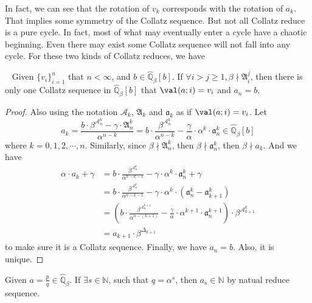 In fact, we can see that the rotation of $v_{k}$ corresponds with the rotation of $a_k$.
That implies some symmetry of the Collatz sequence.
But not all Collatz reduce is a pure cycle.
In fact, most of  what may eventually enter a cycle have a chaotic beginning.
Even there may exist some Collatz sequence will not fall into any cycle.
For these two kinds of Collatz reduces, we have
\begin{theorem}~\label{theorem:any-presequence}
    Given $\{v_{i}\}_{i=1}^{n}$ that $n < \infty$, and $b \in \widehat{\mathbb{Q}}_\beta[b]$.
    If $\forall i>j\ge1, \beta \nmid \mathfrak{A}_i^{j}$, then there is only one Collatz sequence in $\widehat{\mathbb{Q}}_{{\beta}}[b]$ that $\val(a;i) = v_{i}$ and $a_n = b$.
\end{theorem}
\begin{proof}
    Also using the notation $\mathcal{A}_k$, $\mathfrak{A}_k$ and $\mathfrak{a}_k$ as if $\val(a;i) = v_{i}$.
    Let
    \[ a_k = \frac{b \cdot \beta^{\mathcal{A}_n^{k}} - \gamma\cdot\mathfrak{A}_n^{k}}{\alpha^{n-k}} = b \cdot \frac{\beta^{\mathcal{A}_n^{k}}}{\alpha^{n-k}}  - \frac{\gamma}{\alpha}\cdot\alpha^{k}\cdot\mathfrak{a}_n^{k} \in \widehat{\mathbb{Q}}_{{\beta}}[b] \]
    where $k = 0, 1, 2, \cdots, n$.
    Similarly, since $\beta \nmid \mathfrak{A}_n^k$, then $\beta \nmid \mathfrak{a}_n^{k}$, then $\beta \nmid a_k$.
    And we have
    \begin{align*}
        \alpha \cdot a_k + \gamma &= b \cdot \frac{\beta^{\mathcal{A}_n^{k}}}{\alpha^{n-k-1}}  - \gamma\cdot\alpha^{k}\cdot\mathfrak{a}_n^{k} + \gamma \\
        &= b \cdot \frac{\beta^{\mathcal{A}_n^{k}}}{\alpha^{n-k-1}}  - \gamma\cdot\alpha^{k}\cdot\left(\mathfrak{a}_n^{k} - \mathfrak{a}_{k+1}^{k}\right) \\
        &= \left(b \cdot \frac{\beta^{\mathcal{A}_n^{k+1}}}{\alpha^{n-(k+1)}}  - \frac{\gamma}{\alpha}\cdot\alpha^{k+1}\cdot\mathfrak{a}_{n}^{k+1}\right) \cdot \beta^{\mathcal{A}_{k+1}^{k}} \\
        &= a_{k+1} \cdot \beta^{\Delta_{k+1}}
    \end{align*}
    to make sure it is a Collatz sequence.
    Finally, we have $a_n = b$.
    Also, it is unique.
\end{proof}
\begin{corollary}
    Given $a = \frac{   p}{q}\in \widehat{\mathbb{Q}}_{{\beta}}$. If $\exists s\in \mathbb{N}$, such that $q = \alpha^{s}$, then $a_{s} \in \mathbb{N}$ by natual reduce sequence.
\end{corollary}

